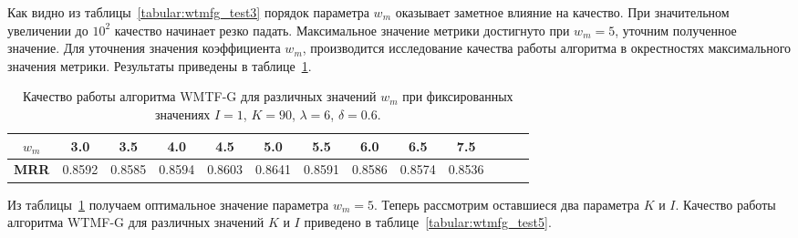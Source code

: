     Как видно из таблицы~\ref{tabular:wtmfg_test3} порядок параметра $w_m$ оказывает заметное влияние на качество. При значительном увеличении до $10^2$ качество начинает резко падать.
    Максимальное значение метрики достигнуто при $w_m=5$, уточним полученное значение.
    Для уточнения значения коэффициента $w_m$, производится исследование качества работы алгоритма в окрестностях максимального значения метрики.
    Результаты приведены в таблице~\ref{tabular:wtmfg_test4}.

    \begin{table}[ht!]
        \caption{Качество работы алгоритма WMTF-G для различных значений $w_m$ при фиксированных значениях $I=1$, $K=90$, $\lambda=6$, $\delta=0.6$. \bigskip}
        \centering

        \label{tabular:wtmfg_test4}
        \begin{tabular}{|c|c|c|c|c|c|c|c|c|c|c|c|c|} \hline
            $w_m$ & 3.0 & 3.5 & 4.0 & 4.5 & 5.0 & 5.5 & 6.0 & 6.5 & 7.5 \\ \hline
            \bf{MRR} & 0.8592 & 0.8585 & 0.8594 & 0.8603 & 0.8641 & 0.8591 & 0.8586 & 0.8574 & 0.8536 \\ \hline

        \end{tabular}
    \end{table}

    Из таблицы~\ref{tabular:wtmfg_test4} получаем оптимальное значение параметра $w_m=5$.
    Теперь рассмотрим оставшиеся два параметра $K$ и $I$. Качество работы алгоритма WTMF-G для различных значений $K$ и $I$ приведено в таблице~\ref{tabular:wtmfg_test5}.

